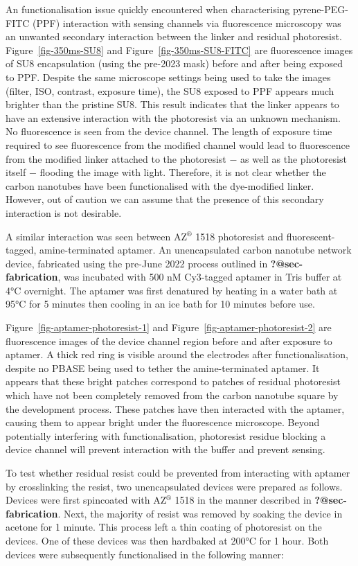 \documentclass[
  a4paper,
]{scrbook}
\begin{document}
An functionalisation issue quickly encountered when characterising
pyrene-PEG-FITC (PPF) interaction with sensing channels via fluorescence
microscopy was an unwanted secondary interaction between the linker and
residual photoresist. Figure~\ref{fig-350ms-SU8} and
Figure~\ref{fig-350ms-SU8-FITC} are fluorescence images of SU8
encapsulation (using the pre-2023 mask) before and after being exposed
to PPF. Despite the same microscope settings being used to take the
images (filter, ISO, contrast, exposure time), the SU8 exposed to PPF
appears much brighter than the pristine SU8. This result indicates that
the linker appears to have an extensive interaction with the photoresist
via an unknown mechanism. No fluorescence is seen from the device
channel. The length of exposure time required to see fluorescence from
the modified channel would lead to fluorescence from the modified linker
attached to the photoresist \(-\) as well as the photoresist itself
\(-\) flooding the image with light. Therefore, it is not clear whether
the carbon nanotubes have been functionalised with the dye-modified
linker. However, out of caution we can assume that the presence of this
secondary interaction is not desirable.

A similar interaction was seen between AZ\(^\circledR\) 1518 photoresist
and fluorescent-tagged, amine-terminated aptamer. An unencapsulated
carbon nanotube network device, fabricated using the pre-June 2022
process outlined in \textbf{?@sec-fabrication}, was incubated with 500
nM Cy3-tagged aptamer in Tris buffer at 4°C overnight. The aptamer was
first denatured by heating in a water bath at 95°C for 5 minutes then
cooling in an ice bath for 10 minutes before use.

Figure~\ref{fig-aptamer-photoresist-1} and
Figure~\ref{fig-aptamer-photoresist-2} are fluorescence images of the
device channel region before and after exposure to aptamer. A thick red
ring is visible around the electrodes after functionalisation, despite
no PBASE being used to tether the amine-terminated aptamer. It appears
that these bright patches correspond to patches of residual photoresist
which have not been completely removed from the carbon nanotube square
by the development process. These patches have then interacted with the
aptamer, causing them to appear bright under the fluorescence
microscope. Beyond potentially interfering with functionalisation,
photoresist residue blocking a device channel will prevent interaction
with the buffer and prevent sensing.

To test whether residual resist could be prevented from interacting with
aptamer by crosslinking the resist, two unencapsulated devices were
prepared as follows. Devices were first spincoated with AZ\(^\circledR\)
1518 in the manner described in \textbf{?@sec-fabrication}. Next, the
majority of resist was removed by soaking the device in acetone for 1
minute. This process left a thin coating of photoresist on the devices.
One of these devices was then hardbaked at 200°C for 1 hour. Both
devices were subsequently functionalised in the following manner:
\end{document}
